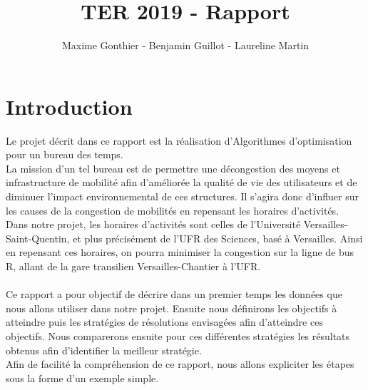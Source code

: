 \documentclass[a4paper,11pt]{article}
\title{TER 2019 - Rapport}
\author{Maxime Gonthier - Benjamin Guillot - Laureline Martin}
\begin{document}
\clearpage
\maketitle

\newpage
\tableofcontents

\newpage
\section{Introduction}
	Le projet décrit dans ce rapport est la réalisation d'Algorithmes d'optimisation pour un bureau des temps.\\
	La mission d'un tel bureau est de permettre une décongestion des moyens et infrastructure de mobilité afin d'améliorée la qualité de vie des utilisateurs	 et de diminuer l'impact environnemental de ces structures. Il s'agira donc d'influer sur les causes de la congestion de mobilités en repensant les horaires d'activités.\\
	Dans notre projet, les horaires d'activités sont celles de l'Université Versailles-Saint-Quentin, et plus précisément de l'UFR des Sciences, basé à Versailles. Ainsi en repensant ces horaires, on pourra minimiser la congestion sur la ligne de bus R, allant de la gare transilien Versailles-Chantier à l'UFR.\\
	\\
	Ce rapport a pour objectif de décrire dans un premier temps les données que nous allons utiliser dans notre projet. Ensuite nous définirons les objectifs à atteindre  puis les stratégies de résolutions envisagées afin d'atteindre ces objectifs.
	Nous comparerons ensuite pour ces différentes stratégies les résultats obtenus afin d'identifier la meilleur stratégie.\\
	Afin de facilité la compréhension de ce rapport, nous allons expliciter les étapes sous la forme d'un exemple simple.
	
	
\end{document}

